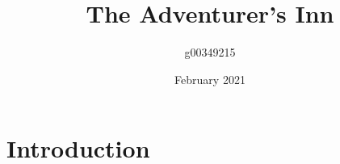 \documentclass{article}
\title{The Adventurer's Inn}
\author{g00349215 }
\date{February 2021}
\begin{document}
\maketitle

\section{Introduction}
\end{document}
